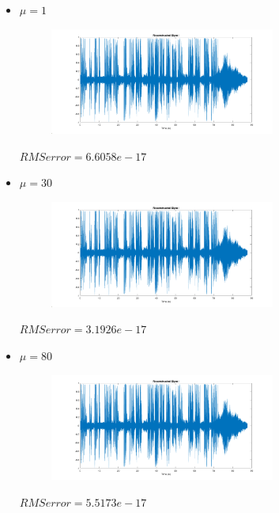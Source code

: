 \documentclass[a4paper]{article}
\begin{document}
\begin{itemize}
	\item 
	$\mu = 1$
	\begin{figure}[H]
		\includegraphics[width=0.7\textwidth]{comsys_fig60.png}\\ 
		\centering
	\end{figure}
	\begin{flushleft}
		$RMS error = 6.6058e-17$
	\end{flushleft}
	
		\item 
	$\mu = 30$
	\begin{figure}[H]
		\includegraphics[width=0.7\textwidth]{comsys_fig61.png}\\ 
		\centering
	\end{figure}
	\begin{flushleft}
		$RMS error = 3.1926e-17$
	\end{flushleft}
	
	\item 
	$\mu = 80$
	\begin{figure}[H]
		\includegraphics[width=0.7\textwidth]{comsys_fig62.png}\\ 
		\centering
	\end{figure}
	\begin{flushleft}
		$RMS error = 5.5173e-17$
	\end{flushleft}
	

\end{itemize}
\end{document}
